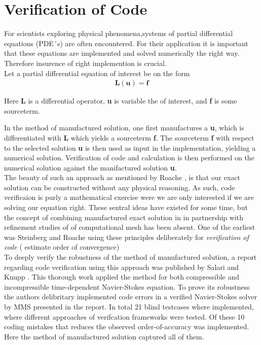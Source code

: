 \section{Verification of Code}
For scientists exploring physical phenomena,systems of partial differential equations (PDE´s) are often encountered. For their application it is important that these equations are implemented and solved numerically the right way.  Therefore insurence of right implemention is crucial. \\

Let a  partial differential equation of interest be on the form
\begin{align*}
\textbf{L}(\textbf{u}) = \textbf{f}
\end{align*}

Here \textbf{L} is a differential operator, \textbf{u} is variable the of interest, and \textbf{f} is some sourceterm.

In the method of manufactured solution, one first manufactures a \textbf{u}, which is differentiated with \textbf{L} which yields a sourceterm  \textbf{f}. The sourceterm \textbf{f} with respect to the selected solution \textbf{u} is then used as input in the implementation, yielding a numerical solution. Verification of code and calculation is then performed on the numerical solution against the manifactured solution \textbf{u}.  \\ 

The beauty of such an approach as mentioned by Roache \cite{Roache2002}, is that our exact solution can be constructed without any physical reasoning. As such, code verificaion is purly a mathematical exercise were we are only interested if we are solving our equation right. These sentral ideas have existed for some time, but the  concept of combining manufactured exact solution in in partnership with refinement studies of of computational mesh has been absent.  One of the earliest was Steinberg and Roache \cite{Steinberg1985} using these principles deliberately for \textit{verification of code} ( estimate order of convergence)\\

To deeply verify the robustness of the method of manufactured solution,  a report regarding code verification using this approach was published by Salari and Knupp \cite{Biggs}. This thorough work applied the method for both compressible and incompressible time-dependent Navier-Stokes equation. To prove its robustness the authors  delibritary implemented  code errors in a verified Navier-Stokes solver by MMS presented in the report. In total 21 blind testcases where implemented, where different approaches of verifcation frameworks were tested. 
Of these 10 coding mistakes that reduces the observed order-of-accuracy was implemented. Here the method of manufactured solution captured all of them. \\

